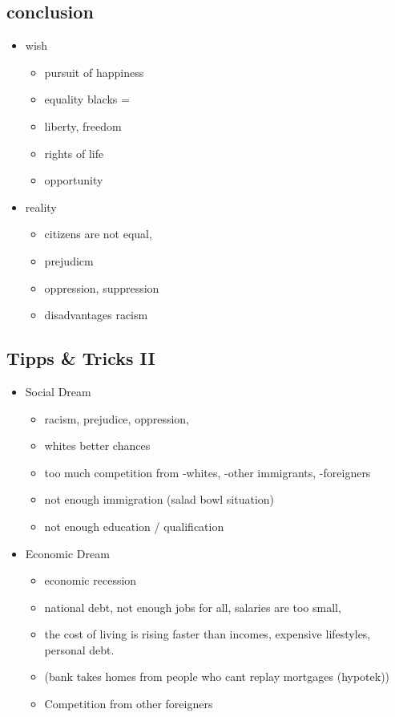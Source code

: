 \documentclass[a5paper,12pt,twoside,titlepage]{scrartcl}
\begin{document}
	\subsection{conclusion}
	\begin{itemize}
		\item wish
		\begin{itemize}
			\item pursuit of happiness
			\item equality \textrightarrow blacks =\frownie
			\item liberty, freedom
			\item rights of life
			\item opportunity 	
		\end{itemize}
		\item reality
		\begin{itemize}
			\item citizens are not equal, 
			\item prejudicm
			\item oppression, suppression
			\item disadvantages \textrightarrow racism
		\end{itemize}
	\end{itemize}
	\subsection{Tipps \& Tricks II}
		\begin{itemize}
			\item Social Dream
			\begin{itemize}
				\item racism, prejudice, oppression, 
				\item whites \textrightarrow better chances
				\item too much competition from -whites, -other immigrants, -foreigners
				\item not enough immigration (salad bowl situation)
				\item not enough education / qualification
			\end{itemize}
			\item Economic Dream
			\begin{itemize}
				\item economic recession
				\item national debt, not enough jobs for all, salaries are too small, 
				\item the cost of living is rising faster than incomes, expensive lifestyles, \textrightarrow personal debt.
				\item (bank takes homes from people who cant replay mortgages (hypotek))
				\item Competition from other foreigners
			\end{itemize}

		\end{itemize}
	
\end{document}
